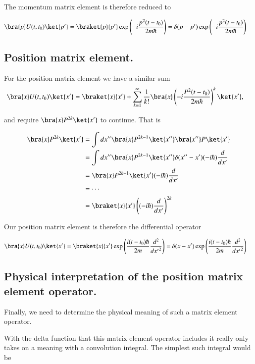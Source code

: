 The momentum matrix element is therefore reduced to

\begin{align}\label{eqn:qmIproblemSet2:1}
\bra{p} U(t,t_0) \ket{p'}
&=
\braket{p}{p'} \exp\left( -i \frac{p^2 (t-t_0)}{2m \hbar} \right)
= \delta(p-p') \exp\left( -i \frac{p^2 (t-t_0)}{2m \hbar} \right)
\end{align}

\subsection{Position matrix element.}
For the position matrix element we have a similar sum
\begin{align*}
\bra{x} U(t,t_0) \ket{x'} 
&= 
\braket{x}{x'} 
+ \sum_{k=1}^\infty \inv{k!} \bra{x} \left( -i \frac{P^2 (t-t_0)}{2m \hbar} \right)^k \ket{x'},
\end{align*}

and require $\bra{x} P^{2k} \ket{x'}$ to continue.  That is

\begin{align*}
\bra{x} P^{2k} \ket{x'}
&=
\int dx''\bra{x} P^{2k-1} \ket{x''}\bra{x''} P \ket{x'} \\
&=
\int dx''\bra{x} P^{2k-1} \ket{x''} \delta(x''-x') (-i\hbar) \frac{d}{dx'} \\
&=
\bra{x} P^{2k-1} \ket{x'} (-i\hbar) \frac{d}{dx'} \\
&= \cdots \\
&= \braket{x}{x'} \left( (-i\hbar) \frac{d}{dx'} \right)^{2k}
\end{align*}

Our position matrix element is therefore the differential operator

\begin{align}\label{eqn:qmIproblemSet2:10}
\bra{x} U(t,t_0) \ket{x'} 
&=
\braket{x}{x'} \exp\left( \frac{i (t-t_0)\hbar}{2m} \frac{d^2}{d{x'}^2} \right)
=\delta(x-x') \exp\left( \frac{i (t-t_0)\hbar}{2m} \frac{d^2}{d{x'}^2} \right)
\end{align}

\subsection{Physical interpretation of the position matrix element operator.}

Finally, we need to determine the physical meaning of such a matrix element operator.  

With the delta function that this matrix element operator includes it really only takes on a meaning with a convolution integral.  The simplest such integral would be

